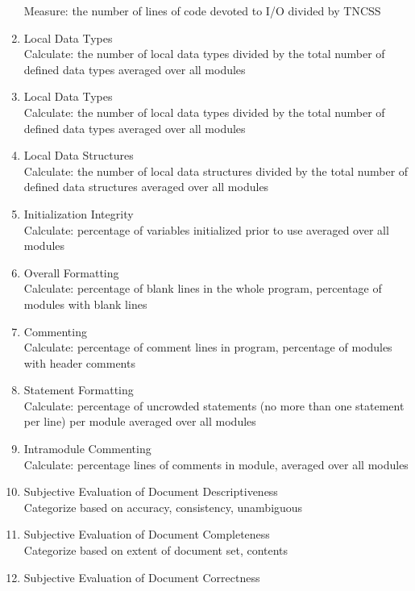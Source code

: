 \documentclass{article}
\begin{document}
\begin{enumerate}
Measure: the number of lines of code devoted to I/O divided by TNCSS
\item Local Data Types\\

Calculate: the number of local data types divided by the total number of defined data types averaged over all modules
\item Local Data Types\\

Calculate: the number of local data types divided by the total number of defined data types averaged over all modules
\item Local Data Structures\\

Calculate: the number of local data structures divided by the total number of defined data structures averaged over all modules
\item Initialization Integrity\\

Calculate: percentage of variables initialized prior to use averaged over all modules
\item Overall Formatting\\

Calculate: percentage of blank lines in the whole program, percentage of modules with blank lines
\item Commenting\\

Calculate: percentage of comment lines in program, percentage of modules with header comments
\item Statement Formatting\\

Calculate: percentage of uncrowded statements (no more than one statement per line) per module averaged over all modules
\item Intramodule Commenting\\ 

Calculate: percentage lines of comments in module, averaged over all modules
\item Subjective Evaluation of Document Descriptiveness\\

Categorize based on accuracy, consistency, unambiguous
\item Subjective Evaluation of Document Completeness\\ 

Categorize based on extent of document set, contents
\item Subjective Evaluation of Document Correctness\\ 


\end{enumerate}
\end{document}
